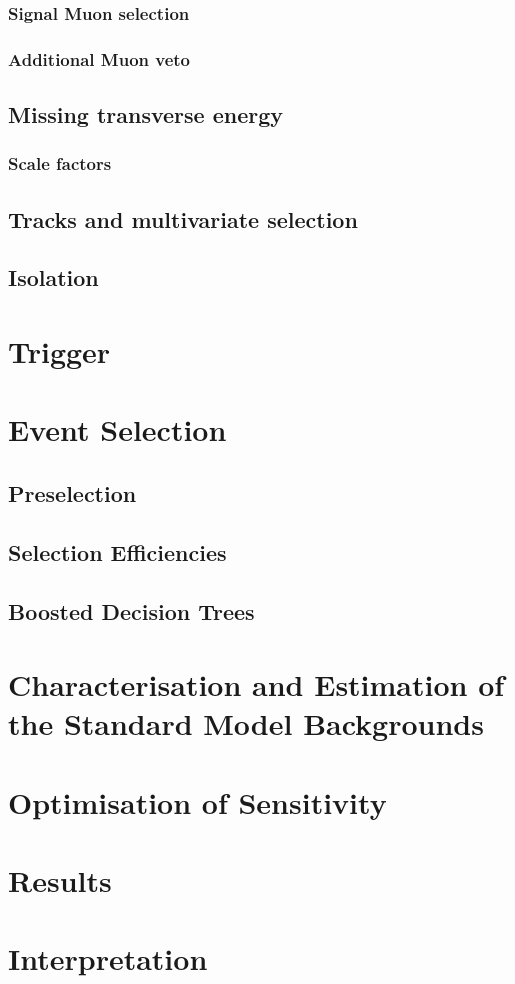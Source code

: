 \subsubsection{Signal Muon selection}
\subsubsection{Additional Muon veto}
\subsection{Missing transverse energy}
\label{subsec:met}

\clearpage
\subsubsection{Scale factors}


\subsection{Tracks and multivariate selection }
\subsection{Isolation}


\section{Trigger}
\label{sec:trigger}

\section{Event Selection}
\subsection{Preselection}
\subsection{Selection Efficiencies}
\subsection{Boosted Decision Trees}

\section{Characterisation and Estimation of the Standard Model Backgrounds}

\section{Optimisation of Sensitivity}

\section{Results}

\section{Interpretation}
